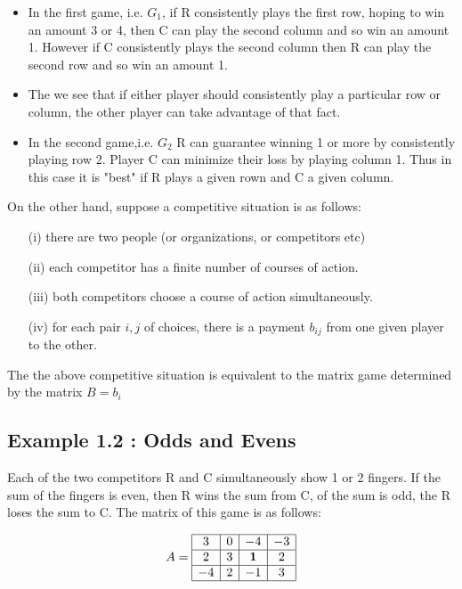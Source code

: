 \documentclass[]{report}
\begin{document}
\begin{itemize}
\item In the first game, i.e. $G_1$, if R consistently plays the first row, hoping to win an amount 3 or 4, then C can play the second column
and so win an amount 1. However if C consistently plays the second column then R can play the second row and so win an amount 1.
\item The we see that if either player should consistently play a particular row or column, the other player can take advantage of that fact.
\item 
In the second game,i.e. $G_2$ R can guarantee winning 1 or more by consistently playing row 2. Player C can minimize their loss by playing column 1. Thus in this case it is "best" if R plays a given rown and C a given column.
\end{itemize}
On the other hand, suppose a competitive situation is as follows:
\begin{itemize}
\item[(i)] there are two people (or organizations, or competitors etc)
\item[(ii)] each competitor has a finite number of courses of action.
\item[(iii)] both competitors choose a course of action simultaneously.
\item[(iv)] for each pair $i,j$ of choices, there is a payment $b_{ij}$ from one given player to the other.
\end{itemize}

The the above competitive situation is equivalent to the matrix game determined by the matrix $B=b_{i}$
\subsection{Example 1.2 : Odds and Evens}
Each of the two competitors R and C simultaneously show 1 or 2 fingers. If the sum of the fingers is even, then R wins the sum from C, of the sum is odd, the R loses the sum to C. The matrix of this game is as follows:

\[
A = 
\begin{array}{|c|c|c|c|} \hline
3 & 0 & -4 & -3 \\ \hline
2 & 3 & \boldsymbol{1} & 2 \\ \hline
-4 & 2 & -1 & 3 \\ \hline
\end{array}
\]
\end{document}
